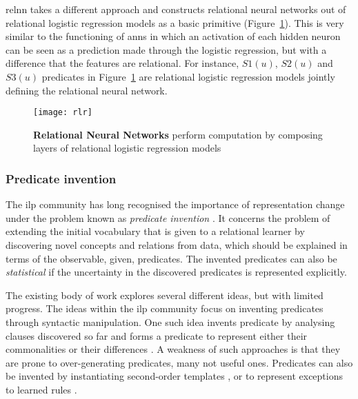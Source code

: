 \gls{relnn} takes a different approach and constructs relational neural networks out of relational logistic regression models as a basic primitive (Figure~\ref{fig:relnn}).
This is very similar to the functioning of \gls{ann}s in which an activation of each hidden neuron can be seen as a prediction made through the logistic regression, but with a difference that the features are relational.
For instance, $S1(u)$, $S2(u)$ and $S3(u)$ predicates in Figure~\ref{fig:relnn} are relational logistic regression models jointly defining the relational neural network.



\begin{figure}
	\centering
	\texttt{[image: rlr]}
	\caption[Relational Neural Networks]{\textbf{Relational Neural Networks} perform computation by composing layers of relational logistic regression models\label{fig:relnn}}
\end{figure}




\subsubsection{Predicate invention}

The \gls{ilp} community has long recognised the importance of representation change under the problem known as \textit{predicate invention} \cite{Kramer1995}.
It concerns the problem of extending the initial vocabulary that is given to a relational learner by discovering novel concepts and relations from data, which should be explained in terms of the observable, given, predicates.
The invented predicates can also be \textit{statistical} if the uncertainty in the discovered predicates is represented explicitly.


The existing body of work explores several different ideas, but with limited progress.
The ideas within the \gls{ilp} community focus on inventing predicates through syntactic manipulation.
One such idea invents predicate by analysing clauses discovered so far and forms a predicate to represent either their commonalities \cite{Wogulis1989} or their differences \cite{MuggletonBu88}.
A weakness of such approaches is that they are prone to over-generating predicates, many not useful ones.
Predicates can also be invented by instantiating second-order templates \cite{Silverstein91}, or to represent exceptions to learned rules \cite{Srinivasan92}.


